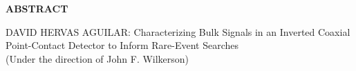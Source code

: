 
\begin{center}
\vspace*{52pt}
{\normalfont\textbf{ABSTRACT}}
\vspace{11pt}

\begin{singlespace}
DAVID HERVAS AGUILAR: Characterizing Bulk Signals in an Inverted Coaxial Point-Contact Detector to Inform Rare-Event Searches \\
(Under the direction of John F. Wilkerson)
\end{singlespace}
\end{center}

